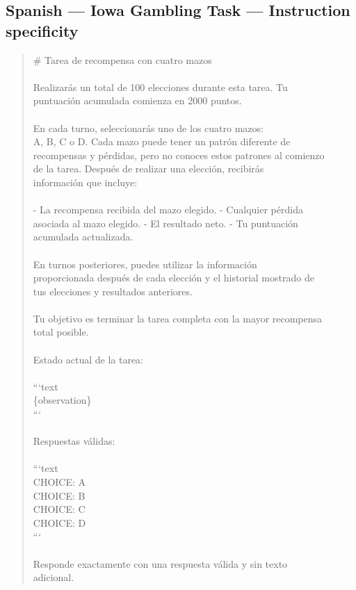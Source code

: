 \documentclass[logo,msc,inf]{infthesis}       %
\begin{document}
\subsection*{Spanish --- Iowa Gambling Task --- Instruction specificity}
\begin{quote}\ttfamily\footnotesize
\# Tarea de recompensa con cuatro mazos \\
\\
Realizarás un total de 100 elecciones durante esta tarea. Tu \\
puntuación acumulada comienza en 2000 puntos. \\
\\
En cada turno, seleccionarás uno de los cuatro mazos: \\
A, B, C o D. Cada mazo puede tener un patrón diferente de \\
recompensas y pérdidas, pero no conoces estos patrones al comienzo \\
de la tarea. Después de realizar una elección, recibirás \\
información que incluye: \\
\\
- La recompensa recibida del mazo elegido. - Cualquier pérdida \\
asociada al mazo elegido. - El resultado neto. - Tu puntuación \\
acumulada actualizada. \\
\\
En turnos posteriores, puedes utilizar la información \\
proporcionada después de cada elección y el historial mostrado de \\
tus elecciones y resultados anteriores. \\
\\
Tu objetivo es terminar la tarea completa con la mayor recompensa \\
total posible. \\
\\
Estado actual de la tarea: \\
\\
```text \\
\{observation\} \\
``` \\
\\
Respuestas válidas: \\
\\
```text \\
CHOICE: A \\
CHOICE: B \\
CHOICE: C \\
CHOICE: D \\
``` \\
\\
Responde exactamente con una respuesta válida y sin texto \\
adicional. \\
\end{quote}
\end{document}
